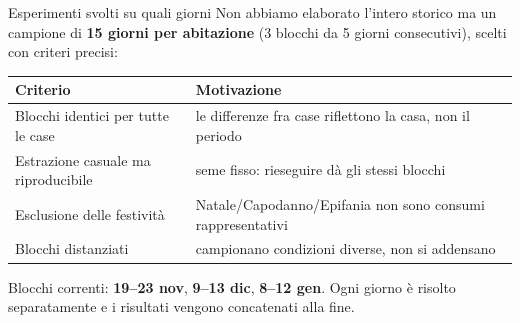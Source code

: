 \documentclass[aspectratio=169]{beamer}
\begin{document}
\begin{frame}{Esperimenti svolti su quali giorni}
  Non abbiamo elaborato l'intero storico ma un campione di \textbf{15 giorni per abitazione}
  (3 blocchi da 5 giorni consecutivi), scelti con criteri precisi:
  \vspace{0.3em}
  \begin{table}\small
    \renewcommand{\arraystretch}{1.2}
    \begin{tabularx}{\textwidth}{l X}
      \toprule
      \textbf{Criterio} & \textbf{Motivazione} \\
      \midrule
      Blocchi identici per tutte le case & le differenze fra case riflettono la casa, non il periodo \\
      Estrazione casuale ma riproducibile & seme fisso: rieseguire d\`a gli stessi blocchi \\
      Esclusione delle festivit\`a & Natale/Capodanno/Epifania non sono consumi rappresentativi \\
      Blocchi distanziati & campionano condizioni diverse, non si addensano \\
      \bottomrule
    \end{tabularx}
  \end{table}
  \vspace{0.2em}
  \small\color{CorpGray}
  Blocchi correnti: \textbf{19--23 nov}, \textbf{9--13 dic}, \textbf{8--12 gen}. Ogni giorno \`e
  risolto separatamente e i risultati vengono concatenati alla fine.
\end{frame}
\end{document}
